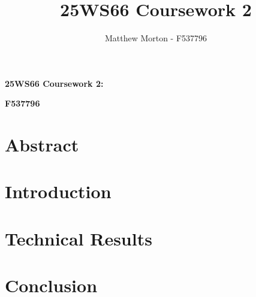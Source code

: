 \documentclass[11pt]{article}
\title{25WS66 Coursework 2}
\author{Matthew Morton - F537796}
\begin{document}
\begin{center}
    \textbf{25WS66 Coursework 2: }

    \textbf{F537796}
\end{center}

\linespread{1.15}

\section*{Abstract}

\hrulefill

\tableofcontents

\hrulefill

\clearpage

\section{Introduction}



\clearpage

\section{Technical Results}



\clearpage

\section{Conclusion}



\clearpage

\printbibliography[heading=bibintoc, title=References]{}
\end{document}
